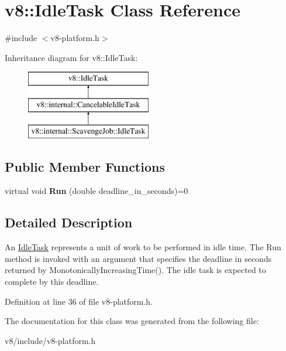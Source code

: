 \hypertarget{classv8_1_1IdleTask}{}\section{v8\+:\+:Idle\+Task Class Reference}
\label{classv8_1_1IdleTask}


{\ttfamily \#include $<$v8-\/platform.\+h$>$}

Inheritance diagram for v8\+:\+:Idle\+Task\+:\begin{figure}[H]
\begin{center}
\leavevmode
\includegraphics[height=3.000000cm]{classv8_1_1IdleTask}
\end{center}
\end{figure}
\subsection*{Public Member Functions}
\begin{DoxyCompactItemize}
\item 
\mbox{\label{classv8_1_1IdleTask_a4f2f238f551b3b2212adffcd5ee2f314}} 
virtual void {\bfseries Run} (double deadline\+\_\+in\+\_\+seconds)=0
\end{DoxyCompactItemize}


\subsection{Detailed Description}
An \mbox{\hyperlink{classv8_1_1IdleTask}{Idle\+Task}} represents a unit of work to be performed in idle time. The Run method is invoked with an argument that specifies the deadline in seconds returned by Monotonically\+Increasing\+Time(). The idle task is expected to complete by this deadline. 

Definition at line 36 of file v8-\/platform.\+h.



The documentation for this class was generated from the following file\+:\begin{DoxyCompactItemize}
\item 
v8/include/v8-\/platform.\+h\end{DoxyCompactItemize}
